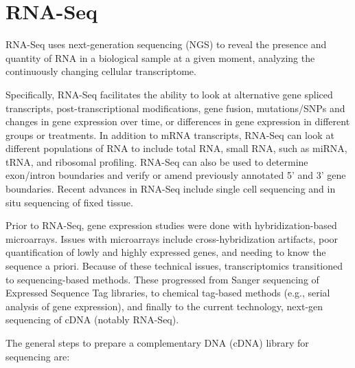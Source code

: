 \hypertarget{rna-seq}{%
\section{RNA-Seq}\label{rna-seq}}

RNA-Seq uses next-generation sequencing (NGS) to reveal the presence and quantity of RNA in a biological sample at a given moment, analyzing the continuously changing cellular transcriptome.

Specifically, RNA-Seq facilitates the ability to look at alternative gene spliced transcripts, post-transcriptional modifications, gene fusion, mutations/SNPs and changes in gene expression over time, or differences in gene expression in different groups or treatments. In addition to mRNA transcripts, RNA-Seq can look at different populations of RNA to include total RNA, small RNA, such as miRNA, tRNA, and ribosomal profiling. RNA-Seq can also be used to determine exon/intron boundaries and verify or amend previously annotated 5' and 3' gene boundaries. Recent advances in RNA-Seq include single cell sequencing and in situ sequencing of fixed tissue.

Prior to RNA-Seq, gene expression studies were done with hybridization-based microarrays. Issues with microarrays include cross-hybridization artifacts, poor quantification of lowly and highly expressed genes, and needing to know the sequence a priori. Because of these technical issues, transcriptomics transitioned to sequencing-based methods. These progressed from Sanger sequencing of Expressed Sequence Tag libraries, to chemical tag-based methods (e.g., serial analysis of gene expression), and finally to the current technology, next-gen sequencing of cDNA (notably RNA-Seq).

The general steps to prepare a complementary DNA (cDNA) library for sequencing are:

